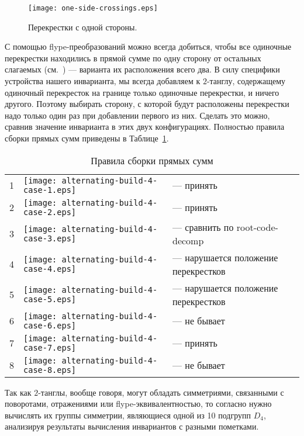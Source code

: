 		\begin{figure}[ht]
			\centering
			\texttt{[image: one-side-crossings.eps]}
			\caption{Перекрестки с одной стороны.\label{figure:one-side-crossings}}
		\end{figure}

		С помощью flype-преобразований можно всегда добиться, чтобы все одиночные перекрестки находились в прямой сумме по одну сторону
		от остальных слагаемых (см.~) --- варианта их расположения всего два. В силу специфики
		устройства нашего инварианта, мы всегда добавляем к $2$-танглу, содержащему одиночный перекресток на границе только одиночные
		перекрестки, и ничего другого. Поэтому выбирать сторону, с которой будут расположены перекрестки надо только один раз при
		добавлении первого из них. Сделать это можно, сравнив значение инварианта в этих двух конфигурациях. Полностью правила
		сборки прямых сумм приведены в Таблице~\ref{table:sums-rules}.

		\begin{table}[ht]
			\caption{Правила сборки прямых сумм\label{table:sums-rules}}
			\centering
			\begin{tabular}{cm{22mm}l}
				\hline
				1 & \texttt{[image: alternating-build-4-case-1.eps]} & --- принять \\
				2 & \texttt{[image: alternating-build-4-case-2.eps]} & --- принять \\
				3 & \texttt{[image: alternating-build-4-case-3.eps]} & --- сравнить по root-code-decomp \\
				4 & \texttt{[image: alternating-build-4-case-4.eps]} & --- нарушается положение перекрестков \\
				5 & \texttt{[image: alternating-build-4-case-5.eps]} & --- нарушается положение перекрестков \\
				6 & \texttt{[image: alternating-build-4-case-6.eps]} & --- не бывает \\
				7 & \texttt{[image: alternating-build-4-case-7.eps]} & --- принять \\
				8 & \texttt{[image: alternating-build-4-case-8.eps]} & --- не бывает \\
				\hline
			\end{tabular}
		\end{table}

		Так как $2$-танглы, вообще говоря, могут обладать симметриями, связанными с поворотами, отражениями или flype-эквивалентностью,
		то согласно  нужно вычислять их группы симметрии, являющиеся одной из 10 подгрупп $D_4$, анализируя
		результаты вычисления инвариантов с разными пометками.

